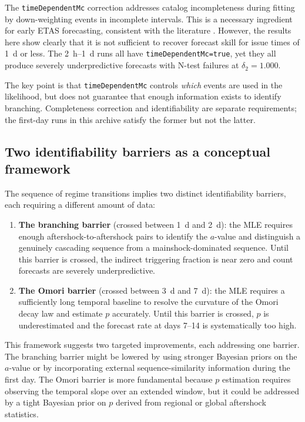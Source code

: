 \documentclass[12pt,letterpaper]{article}
\begin{document}
The \texttt{timeDependentMc} correction addresses catalog incompleteness during
fitting by down-weighting events in incomplete intervals. This is a necessary
ingredient for early ETAS forecasting, consistent with the literature
\cite{omi2013,omi2014,page2016,seif2017,hainzl2024}. However, the results here
show clearly that it is not sufficient to recover forecast skill for issue times
of 1~d or less. The 2~h--1~d runs all have \texttt{timeDependentMc=true}, yet
they all produce severely underpredictive forecasts with N-test failures at
$\delta_2=1.000$.

The key point is that \texttt{timeDependentMc} controls \emph{which} events are
used in the likelihood, but does not guarantee that enough information exists
to identify branching. Completeness correction and identifiability are separate
requirements; the first-day runs in this archive satisfy the former but not the
latter.

\subsection{Two identifiability barriers as a conceptual framework}

The sequence of regime transitions implies two distinct identifiability
barriers, each requiring a different amount of data:

\begin{enumerate}
    \item \textbf{The branching barrier} (crossed between 1~d and 2~d): the
    MLE requires enough aftershock-to-aftershock pairs to identify the $a$-value
    and distinguish a genuinely cascading sequence from a mainshock-dominated
    sequence. Until this barrier is crossed, the indirect triggering fraction is
    near zero and count forecasts are severely underpredictive.

    \item \textbf{The Omori barrier} (crossed between 3~d and 7~d): the MLE
    requires a sufficiently long temporal baseline to resolve the curvature of
    the Omori decay law and estimate $p$ accurately. Until this barrier is
    crossed, $p$ is underestimated and the forecast rate at days 7--14 is
    systematically too high.
\end{enumerate}

This framework suggests two targeted improvements, each addressing one barrier.
The branching barrier might be lowered by using stronger Bayesian priors on the
$a$-value or by incorporating external sequence-similarity information during
the first day. The Omori barrier is more fundamental because $p$ estimation
requires observing the temporal slope over an extended window, but it could be
addressed by a tight Bayesian prior on $p$ derived from regional or global
aftershock statistics.
\end{document}
